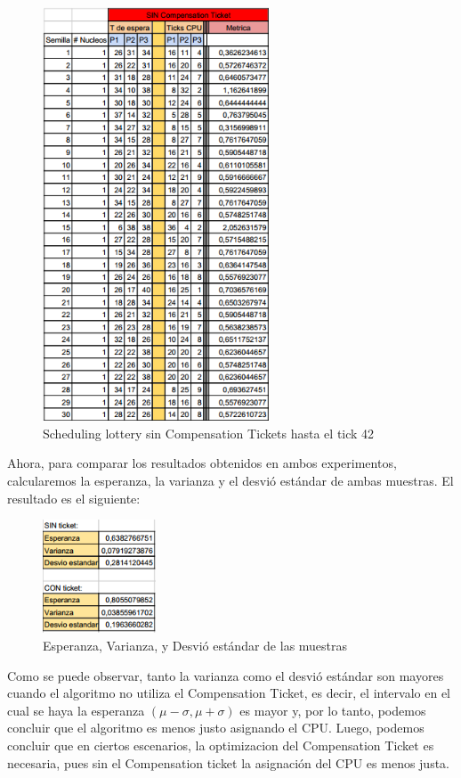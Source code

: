 \begin{figure}[H]
\begin{center}
\includegraphics[width=0.6\textwidth]{img/refotaza2.png}
     \caption{Scheduling lottery sin Compensation Tickets hasta el tick 42}
\end{center}
\end{figure}


Ahora, para comparar los resultados obtenidos en ambos experimentos, calcularemos la esperanza, la varianza y el desvió estándar de ambas muestras.
El resultado es el siguiente:
\begin{figure}[H]
\begin{center}
\includegraphics[width=0.3\textwidth]{img/refotaza3.png}
     \caption{Esperanza, Varianza, y Desvió estándar de las muestras}
\end{center}
\end{figure}

Como se puede observar, tanto la varianza como el desvió estándar son mayores cuando el algoritmo no utiliza el Compensation Ticket, es decir, el intervalo en el cual se haya la esperanza $(\mu - \sigma, \mu + \sigma)$ es mayor y, por lo tanto, podemos concluir que el algoritmo es menos justo asignando el CPU.
Luego, podemos concluir que en ciertos escenarios, la optimizacion del Compensation Ticket es necesaria, pues sin el Compensation ticket la asignación del CPU es menos justa.
